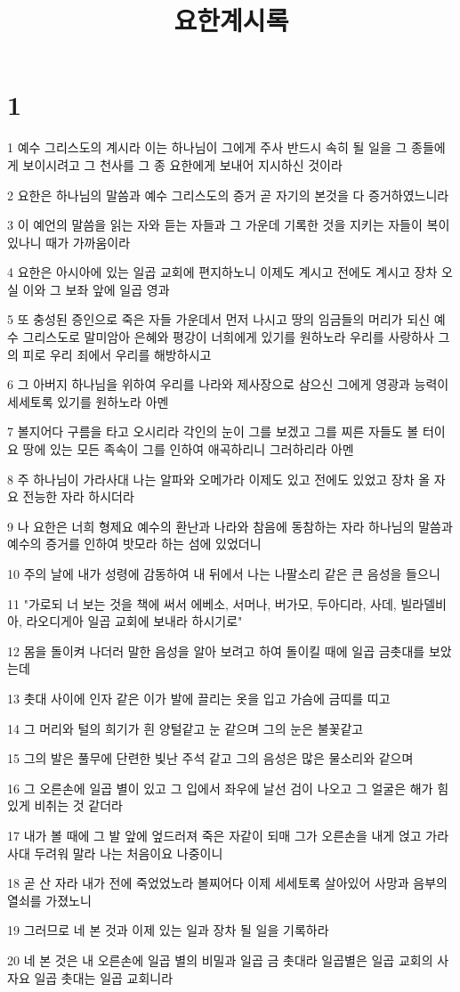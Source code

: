 

\title{요한계시록}


\chapter{1}

\par 1 예수 그리스도의 계시라 이는 하나님이 그에게 주사 반드시 속히 될 일을 그 종들에게 보이시려고 그 천사를 그 종 요한에게 보내어 지시하신 것이라
\par 2 요한은 하나님의 말씀과 예수 그리스도의 증거 곧 자기의 본것을 다 증거하였느니라
\par 3 이 예언의 말씀을 읽는 자와 듣는 자들과 그 가운데 기록한 것을 지키는 자들이 복이 있나니 때가 가까움이라
\par 4 요한은 아시아에 있는 일곱 교회에 편지하노니 이제도 계시고 전에도 계시고 장차 오실 이와 그 보좌 앞에 일곱 영과
\par 5 또 충성된 증인으로 죽은 자들 가운데서 먼저 나시고 땅의 임금들의 머리가 되신 예수 그리스도로 말미암아 은혜와 평강이 너희에게 있기를 원하노라 우리를 사랑하사 그의 피로 우리 죄에서 우리를 해방하시고
\par 6 그 아버지 하나님을 위하여 우리를 나라와 제사장으로 삼으신 그에게 영광과 능력이 세세토록 있기를 원하노라 아멘
\par 7 볼지어다 구름을 타고 오시리라 각인의 눈이 그를 보겠고 그를 찌른 자들도 볼 터이요 땅에 있는 모든 족속이 그를 인하여 애곡하리니 그러하리라 아멘
\par 8 주 하나님이 가라사대 나는 알파와 오메가라 이제도 있고 전에도 있었고 장차 올 자요 전능한 자라 하시더라
\par 9 나 요한은 너희 형제요 예수의 환난과 나라와 참음에 동참하는 자라 하나님의 말씀과 예수의 증거를 인하여 밧모라 하는 섬에 있었더니
\par 10 주의 날에 내가 성령에 감동하여 내 뒤에서 나는 나팔소리 같은 큰 음성을 들으니
\par 11 "가로되 너 보는 것을 책에 써서 에베소, 서머나, 버가모, 두아디라, 사데, 빌라델비아, 라오디게아 일곱 교회에 보내라 하시기로"
\par 12 몸을 돌이켜 나더러 말한 음성을 알아 보려고 하여 돌이킬 때에 일곱 금촛대를 보았는데
\par 13 촛대 사이에 인자 같은 이가 발에 끌리는 옷을 입고 가슴에 금띠를 띠고
\par 14 그 머리와 털의 희기가 흰 양털같고 눈 같으며 그의 눈은 불꽃같고
\par 15 그의 발은 풀무에 단련한 빛난 주석 같고 그의 음성은 많은 물소리와 같으며
\par 16 그 오른손에 일곱 별이 있고 그 입에서 좌우에 날선 검이 나오고 그 얼굴은 해가 힘있게 비취는 것 같더라
\par 17 내가 볼 때에 그 발 앞에 엎드러져 죽은 자같이 되매 그가 오른손을 내게 얹고 가라사대 두려워 말라 나는 처음이요 나중이니
\par 18 곧 산 자라 내가 전에 죽었었노라 볼찌어다 이제 세세토록 살아있어 사망과 음부의 열쇠를 가졌노니
\par 19 그러므로 네 본 것과 이제 있는 일과 장차 될 일을 기록하라
\par 20 네 본 것은 내 오른손에 일곱 별의 비밀과 일곱 금 촛대라 일곱별은 일곱 교회의 사자요 일곱 촛대는 일곱 교회니라

